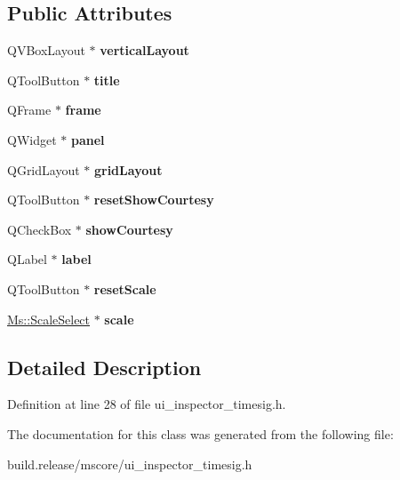 \subsection*{Public Attributes}
\begin{DoxyCompactItemize}
\item 
\mbox{\label{class_ui___inspector_time_sig_a93c16044a60b9fc9349dfe05ec67ea82}} 
Q\+V\+Box\+Layout $\ast$ {\bfseries vertical\+Layout}
\item 
\mbox{\label{class_ui___inspector_time_sig_acc3b338a068df2c45aecfc4c9ebc7141}} 
Q\+Tool\+Button $\ast$ {\bfseries title}
\item 
\mbox{\label{class_ui___inspector_time_sig_a0fd3832e9298485aa246c706885e0393}} 
Q\+Frame $\ast$ {\bfseries frame}
\item 
\mbox{\label{class_ui___inspector_time_sig_aab5e62c0f548658e94a8705b7f25cd14}} 
Q\+Widget $\ast$ {\bfseries panel}
\item 
\mbox{\label{class_ui___inspector_time_sig_a4d13c5719a3372adf3c3fdc6db4fa554}} 
Q\+Grid\+Layout $\ast$ {\bfseries grid\+Layout}
\item 
\mbox{\label{class_ui___inspector_time_sig_a296d1a1887d96df4a77e5a00653144a6}} 
Q\+Tool\+Button $\ast$ {\bfseries reset\+Show\+Courtesy}
\item 
\mbox{\label{class_ui___inspector_time_sig_abbcd65e195e961b0a39c5c2d3be755d7}} 
Q\+Check\+Box $\ast$ {\bfseries show\+Courtesy}
\item 
\mbox{\label{class_ui___inspector_time_sig_af5e9d4a8246404a83875307616258c2e}} 
Q\+Label $\ast$ {\bfseries label}
\item 
\mbox{\label{class_ui___inspector_time_sig_a89a6b169fc06b3737e79858bc6d1692e}} 
Q\+Tool\+Button $\ast$ {\bfseries reset\+Scale}
\item 
\mbox{\label{class_ui___inspector_time_sig_afe949315cc03c5903bad887fcb65e68c}} 
\hyperlink{class_ms_1_1_scale_select}{Ms\+::\+Scale\+Select} $\ast$ {\bfseries scale}
\end{DoxyCompactItemize}


\subsection{Detailed Description}


Definition at line 28 of file ui\+\_\+inspector\+\_\+timesig.\+h.



The documentation for this class was generated from the following file\+:\begin{DoxyCompactItemize}
\item 
build.\+release/mscore/ui\+\_\+inspector\+\_\+timesig.\+h\end{DoxyCompactItemize}
